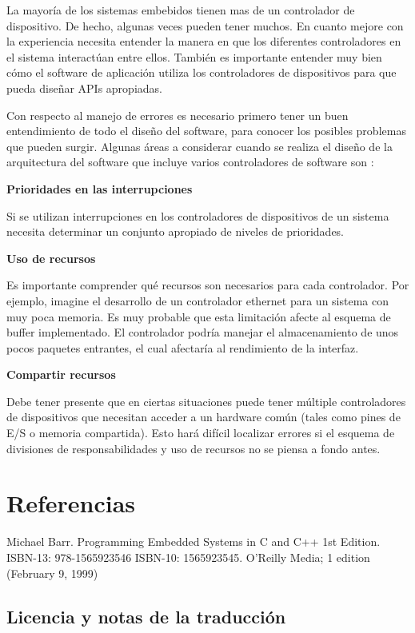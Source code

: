 \documentclass[12pt]{article}
\begin{document}
La mayoría de los sistemas embebidos tienen mas de un controlador de dispositivo.
De hecho, algunas veces pueden tener muchos. En cuanto
mejore con la experiencia necesita entender la manera en que los
diferentes controladores en el sistema interactúan entre ellos. 
También es importante entender muy bien cómo el software de aplicación 
utiliza los controladores de dispositivos para que pueda diseñar APIs apropiadas.

Con respecto al manejo de errores es necesario primero tener un 
buen entendimiento de todo el diseño
del software, para conocer los posibles problemas que pueden surgir.
Algunas áreas a considerar cuando se realiza el diseño de la arquitectura
del software que incluye varios controladores de software son :

{\bf Prioridades en las interrupciones}

Si se utilizan interrupciones en los controladores de dispositivos
de un sistema necesita determinar un conjunto apropiado de niveles
de prioridades.


{\bf Uso de recursos}

Es importante comprender qué recursos son necesarios para cada controlador.
Por ejemplo, imagine el desarrollo de un controlador ethernet para un 
sistema con muy poca memoria.
Es muy probable que esta limitación afecte al esquema de buffer implementado.
El controlador podría manejar el almacenamiento de unos
pocos paquetes entrantes, el cual afectaría al rendimiento de la 
interfaz.

{\bf Compartir recursos}

Debe tener presente que en ciertas situaciones puede tener múltiple
controladores de dispositivos que necesitan acceder a un hardware común 
(tales como pines de E/S o memoria compartida).
Esto hará difícil localizar errores si el
esquema de divisiones de responsabilidades y uso de recursos
no se piensa a fondo antes.





\section*{Referencias}

Michael Barr. Programming Embedded Systems in C and C++ 1st Edition. ISBN-13: 978-1565923546
ISBN-10: 1565923545. O'Reilly Media; 1 edition (February 9, 1999)

\subsection*{Licencia y notas de la traducción}
\end{document}
